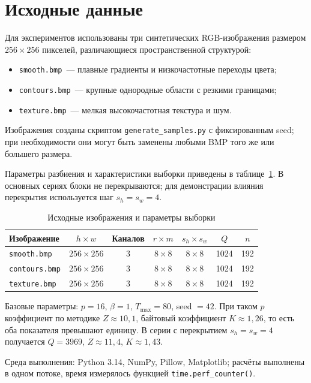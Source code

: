 \section{Исходные данные}
\label{sec:data}

Для экспериментов использованы три синтетических RGB-изображения размером $256 \times 256$ пикселей, различающиеся пространственной структурой:
\begin{itemize}
	\item \texttt{smooth.bmp}~--- плавные градиенты и низкочастотные переходы цвета;
	\item \texttt{contours.bmp}~--- крупные однородные области с резкими границами;
	\item \texttt{texture.bmp}~--- мелкая высокочастотная текстура и шум.
\end{itemize}
Изображения созданы скриптом \texttt{generate\_samples.py} с фиксированным seed; при необходимости они могут быть заменены любыми BMP того же или большего размера.

Параметры разбиения и характеристики выборки приведены в таблице~\ref{tab:data}. В основных сериях блоки не перекрываются; для демонстрации влияния перекрытия используется шаг $s_h=s_w=4$.

\begin{table}[H]
	\centering
	\caption{Исходные изображения и параметры выборки}
	\label{tab:data}
	\begin{tabular}{@{}lcccccc@{}}
		\hline
		Изображение & $h \times w$ & Каналов & $r \times m$ & $s_h \times s_w$ & $Q$ & $n$ \\
		\hline
		\texttt{smooth.bmp}   & $256\times256$ & 3 & $8\times8$ & $8\times8$ & 1024 & 192 \\
		\texttt{contours.bmp} & $256\times256$ & 3 & $8\times8$ & $8\times8$ & 1024 & 192 \\
		\texttt{texture.bmp}  & $256\times256$ & 3 & $8\times8$ & $8\times8$ & 1024 & 192 \\
		\hline
	\end{tabular}
\end{table}

Базовые параметры: $p=16$, $\beta=1$, $T_{\max}=80$, seed $=42$. При таком $p$ коэффициент по методике $Z \approx 10{,}1$, байтовый коэффициент $K \approx 1{,}26$, то есть оба показателя превышают единицу. В серии с перекрытием $s_h=s_w=4$ получается $Q=3969$, $Z\approx11{,}4$, $K\approx1{,}43$.

Среда выполнения: Python 3.14, NumPy, Pillow, Matplotlib; расчёты выполнены в одном потоке, время измерялось функцией \texttt{time.perf\_counter()}.
